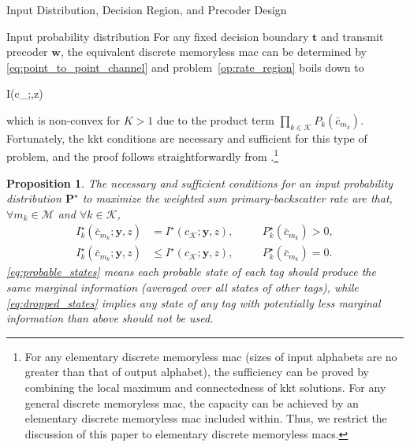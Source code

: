 \documentclass[journal]{IEEEtran}
\newtheorem{proposition}{Proposition}
\begin{document}
\begin{section}{Input Distribution, Decision Region, and Precoder Design}
		\begin{subsection}{Input probability distribution}
			For any fixed decision boundary $\boldsymbol{t}$ and transmit precoder $\boldsymbol{w}$, the equivalent discrete memoryless \gls{mac} can be determined by \eqref{eq:point_to_point_channel} and problem~\eqref{op:rate_region} boils down to
			\begin{maxi!}
				{}{I(c_{};,z)}{\label{op:input_probability_distribution}}{}
				\addConstraint{\eqref{co:sum_probability},\eqref{co:nonnegative_probability},}
			\end{maxi!}
			which is non-convex for $K > 1$ due to the product term $\prod_{k \in \mathcal{K}} P_k(\bar{c}_{m_k})$. Fortunately, the \gls{kkt} conditions are necessary and sufficient for this type of problem, and the proof follows straightforwardly from \cite{Watanabe2009}.\footnote{For any elementary discrete memoryless \gls{mac} (sizes of input alphabets are no greater than that of output alphabet), the sufficiency can be proved by combining the local maximum and connectedness of \gls{kkt} solutions. For any general discrete memoryless \gls{mac}, the capacity can be achieved by an elementary discrete memoryless \gls{mac} included within. Thus, we restrict the discussion of this paper to elementary discrete memoryless \gls{mac}s.}
			\begin{proposition}
				The necessary and sufficient conditions for an input probability distribution $\boldsymbol{P}^\star$ to maximize the weighted sum primary-backscatter rate are that, $\forall m_k \in \mathcal{M}$ and $\forall k \in \mathcal{K}$,
				\begin{subequations}
					\label{eq:optimal_conditions}
					\begin{alignat}{2}
						I_k^\star(\bar{c}_{m_k};\boldsymbol{y},z) & = I^\star(c_{\mathcal{K}};\boldsymbol{y},z), \quad && P_k^\star(\bar{c}_{m_k}) > 0,\label{eq:probable_states}\\
						I_k^\star(\bar{c}_{m_k};\boldsymbol{y},z) & \le I^\star(c_{\mathcal{K}};\boldsymbol{y},z), \quad && P_k^\star(\bar{c}_{m_k}) = 0.\label{eq:dropped_states}
					\end{alignat}
				\end{subequations}
				\eqref{eq:probable_states} means each probable state of each tag should produce the same marginal information (averaged over all states of other tags), while \eqref{eq:dropped_states} implies any state of any tag with potentially less marginal information than above should not be used.

\end{proposition}
\end{subsection}
\end{section}
\end{document}
